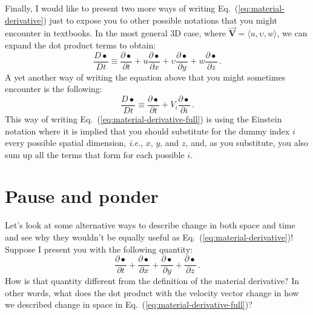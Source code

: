 
Finally, I would like to present two more ways of writing Eq.~(\ref{eq:material-derivative}) just to expose you to other possible notations that you might encounter in textbooks. 
In the most general 3D case, where $\vec{\bm{V}} = \langle u, \upsilon, w \rangle$, we can expand the dot product terms to obtain:
\begin{equation} \label{eq:material-derivative-full}
\frac{D \bullet}{D t} \equiv \frac{\partial \bullet}{\partial t} + u \frac{\partial \bullet}{\partial x} + \upsilon \frac{\partial \bullet}{\partial y} + w \frac{\partial \bullet}{\partial z} \, .
\end{equation}
A yet another way of writing the equation above that you might sometimes encounter is the following:
\begin{equation} \label{eq:material-derivative-ein stein}
\frac{D \bullet}{D t} \equiv \frac{\partial \bullet}{\partial t} + V_i \frac{\partial \bullet}{\partial i} \, .
\end{equation}
This way of writing Eq.~(\ref{eq:material-derivative-full}) is using the Einstein notation where it is implied that you should substitute for the dummy index $i$ every possible spatial dimension, \textit{i.e.}, $x$, $y$, and $z$, and, as you substitute, you also sum up all the terms that form for each possible $i$.

\section{Pause and ponder}

Let's look at some alternative ways to describe change in both space and time and see why they wouldn't be equally useful as Eq.~(\ref{eq:material-derivative})! Suppose I present you with the following quantity:
\begin{equation} \label{eq:all-derivatives}
\frac{\partial \bullet}{\partial t} + \frac{\partial \bullet}{\partial x} + \frac{\partial \bullet}{\partial y} + \frac{\partial \bullet}{\partial z} \, .
\end{equation}
How is that quantity different from the definition of the material derivative? In other words, what does the dot product with the velocity vector change in how we described change in space in Eq.~(\ref{eq:material-derivative-full})?

